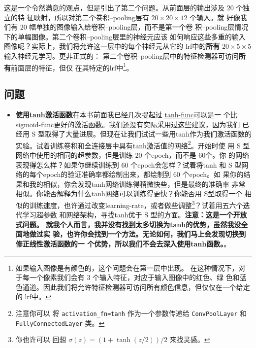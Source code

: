 这是一个令然满意的观点，但是引出了第二个问题。从前面层的输出涉及 $20$ 个独立的特
征映射，所以对第二个卷积--\gls*{pooling}层有 $20 \times 20 \times 12$ 个输入。就
好像我们有 $20$ 幅单独的图像输入给卷积--\gls*{pooling}层，而不是第一个卷
积--\gls*{pooling}层情况下的单幅图像。第二个卷积--\gls*{pooling}层里的神经元应该
如何响应这些多重的输入图像呢？实际上，我们将允许这一层中的每个神经元从它的%
\gls*{lrf}中的\textbf{所有} $20 \times 5 \times 5$ 输入神经元学习。更非正式的：
第二个卷积--\gls*{pooling}层中的特征检测器可访问\textbf{所有}前面层的特征，但仅
在其特定的\gls*{lrf}中\footnote{如果输入图像是有颜色的，这个问题会在第一层中出现。
  在这种情况下，对于每一个像素我们会有 3 个输入特征，对应于输入图像中的红色、绿
  色和蓝色通道。因此我们将允许特征检测器可访问所有颜色信息，但仅仅在一个给定的%
  \gls*{lrf}中。}。

\subsection*{问题}

\begin{itemize}
\item \textbf{使用\gls*{tanh}激活函数}\quad 在本书前面我已经几次提起过%
  \hyperref[subsec:other_models_of_artificial_neuron]{\gls*{tanh-func}}可以是一
  个比 \gls*{sigmoid-func}更好的激活函数。我们还没有实际采用过这些建议，因为我们
  已经用 S 型取得了大量进展。但现在让我们试试一些用\gls*{tanh}作为我们激活函数的
  实验。试着训练卷积和全连接层中具有\gls*{tanh}激活值的网络\footnote{注意你可以
    将 \lstinline!activation_fn=tanh! 作为一个参数传递给
    \lstinline!ConvPoolLayer! 和 \lstinline!FullyConnectedLayer! 类。}。开始时使
  用 S 型网络中使用的相同的超参数，但是训练 $20$ 个\gls*{epoch}，而不是 $60$个。你
  的网络表现得怎么样？如果你继续训练到 $60$ 个\gls*{epoch}会怎样？试着将\gls*{tanh}
  和 S 型网络的每个\gls*{epoch}的验证准确率都绘制出来，都绘制到 $60$ 个\gls*{epoch}。如
  果你的结果和我的相似，你会发现\gls*{tanh}网络训练得稍微快些，但是最终的准确率
  非常相似。你能否解释为什么\gls*{tanh}网络可以训练得更快？你能否用 S型取得一个
  相似的训练速度，也许通过改变\gls*{learning-rate}，或者做些调整\footnote{你也许可以
    回想 $\sigma(z) = (1+\tanh(z/2))/2$ 来找灵感。}？试着用五六个迭代学习超参数
  和网络架构，寻找\gls*{tanh}优于 S 型的方面。\textbf{注意：这是一个开放式问题。
    就我个人而言，我并没有找到太多切换为\gls*{tanh}的优势，虽然我没全面地做过实
    验，也许你会找到一个方法。无论如何，我们马上会发现切换到修正线性激活函数的一
    个优势，所以我们不会去深入使用\gls*{tanh}函数。}。
\end{itemize}

